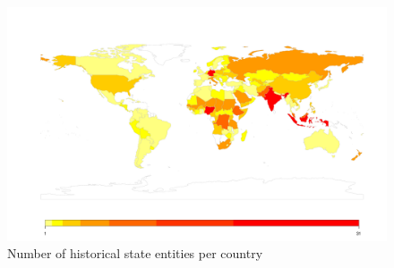     \begin{figure}[!htb] \hspace{-0,5cm} \includegraphics[width=\textwidth,
    height=\textheight, keepaspectratio]{img/statesplot.pdf} \caption{Number of
    historical state entities per country} \label{Fig: ISDstates} \end{figure}
    
